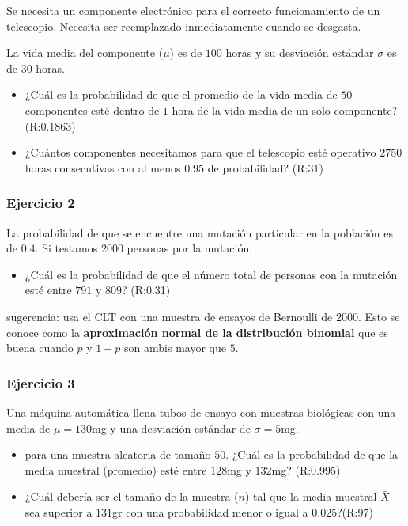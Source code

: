 \documentclass[
]{book}
\providecommand{\tightlist}{%
  \setlength{\itemsep}{0pt}\setlength{\parskip}{0pt}}
\begin{document}
Se necesita un componente electrónico para el correcto funcionamiento de un telescopio. Necesita ser reemplazado inmediatamente cuando se desgasta.

La vida media del componente (\(\mu\)) es de \(100\) horas y su desviación estándar \(\sigma\) es de \(30\) horas.

\begin{itemize}
\item
  ¿Cuál es la probabilidad de que el promedio de la vida media de \(50\) componentes esté dentro de \(1\) hora de la vida media de un solo componente? (R:0.1863)
\item
  ¿Cuántos componentes necesitamos para que el telescopio esté operativo \(2750\) horas consecutivas con al menos \(0.95\) de probabilidad? (R:31)
\end{itemize}

\hypertarget{ejercicio-2-8}{%
\subsubsection{Ejercicio 2}\label{ejercicio-2-8}}

La probabilidad de que se encuentre una mutación particular en la población es de \(0.4\). Si testamos \(2000\) personas por la mutación:

\begin{itemize}
\tightlist
\item
  ¿Cuál es la probabilidad de que el número total de personas con la mutación esté entre \(791\) y \(809\)? (R:0.31)
\end{itemize}

sugerencia: usa el CLT con una muestra de ensayos de Bernoulli de \(2000\). Esto se conoce como la \textbf{aproximación normal de la distribución binomial} que es buena cuando \(p\) y \(1-p\) son ambis mayor que \(5\).

\hypertarget{ejercicio-3-5}{%
\subsubsection{Ejercicio 3}\label{ejercicio-3-5}}

Una máquina automática llena tubos de ensayo con muestras biológicas con una media de \(\mu=130\)mg y una desviación estándar de \(\sigma=5\)mg.

\begin{itemize}
\item
  para una muestra aleatoria de tamaño \(50\). ¿Cuál es la probabilidad de que
  la media muestral (promedio) esté entre \(128\)mg y \(132\)mg? (R:0.995)
\item
  ¿Cuál debería ser el tamaño de la muestra (\(n\)) tal que la media muestral \(\bar{X}\) sea superior a \(131\)gr con una probabilidad menor o igual a \(0.025\)?(R:97)
\end{itemize}
\end{document}
